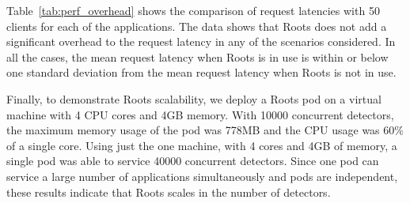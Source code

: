 Table~\ref{tab:perf_overhead} shows the comparison of request 
latencies with 50 clients for each of the applications. 
The data shows that Roots does not add a significant overhead
to the request latency in any of the scenarios considered. In all the cases,
the mean request latency when Roots is in use is within or below one standard deviation
from the mean request latency when Roots is not in use.



Finally, to demonstrate Roots scalability, we deploy
a Roots pod on a virtual machine with 4 CPU cores and 4GB memory.
%
%
%
With 10000 concurrent detectors, the maximum memory usage of the pod was 778MB and the CPU usage
was 60\% of a single core.  Using just the one machine, with 4 cores and 4GB of
memory, a single pod was able to service 40000 concurrent detectors. 
Since one pod can service a large number of applications simultaneously
 and pods are independent, these results indicate that Roots 
scales in the number of detectors.

%
